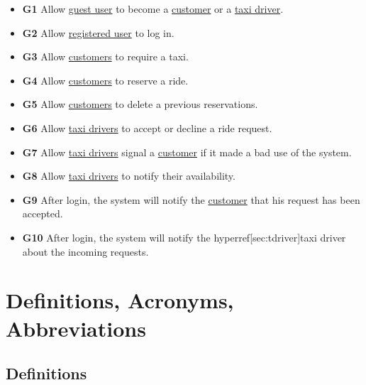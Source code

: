 \documentclass{report}
\begin{document}
		\begin{itemize}
			\item \textbf{\lbrack G1\rbrack}\label{sec:g1} Allow \hyperref[sec:normaluser]{guest user} to become a \hyperref[sec:customer]{customer} or a \hyperref[sec:tdriver]{taxi driver}.

			\item \textbf{\lbrack G2\rbrack}\label{sec:g2}  Allow \hyperref[sec:ruser]{registered user} to log in.

			\item \textbf{\lbrack G3\rbrack}\label{sec:g3}  Allow \hyperref[sec:customer]{customers} to require a taxi.

			\item \textbf{\lbrack G4\rbrack}\label{sec:g4}  Allow \hyperref[sec:customer]{customers} to reserve a ride.

			\item \textbf{\lbrack G5\rbrack}\label{sec:g5}  Allow \hyperref[sec:customer]{customers} to delete a previous reservations.

			\item \textbf{\lbrack G6\rbrack}\label{sec:g6}  Allow \hyperref[sec:tdriver]{taxi drivers} to accept or decline a ride request.

			\item \textbf{\lbrack G7\rbrack}\label{sec:g7} Allow \hyperref[sec:tdriver]{taxi drivers} signal a \hyperref[sec:customer]{customer} if it made a bad use of the system.

			\item \textbf{\lbrack G8\rbrack}\label{sec:g8}  Allow \hyperref[sec:tdriver]{taxi drivers} to notify their availability.

			\item \textbf{\lbrack G9\rbrack}\label{sec:g9}  After login, the system will notify the \hyperref[sec:customer]{customer} that his request has been accepted.

			\item \textbf{\lbrack G10\rbrack}\label{sec:g10}  After login, the system will notify the hyperref[sec:tdriver]{taxi driver} about the incoming requests.
		\end{itemize}
		
	\section{Definitions, Acronyms, Abbreviations}
		
		\subsection{Definitions}
\end{document}
